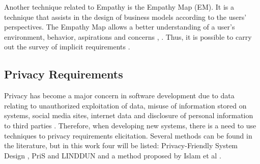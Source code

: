 \documentclass[conference]{IEEEtran}
\begin{document}

Another technique related to Empathy is the Empathy Map (EM). It is a technique that assists in the design of business models according to the users' perspectives. The Empathy Map allows a better understanding of a user's environment, behavior, aspirations and concerns \cite{DBLP:conf/hci/FerreiraBC16}, \cite{DBLP:conf/hicss/BittnerS19}. Thus, it is possible to carry out the survey of implicit requirements \cite{DBLP:conf/re/LevyH18}.

\subsection{Privacy Requirements}


Privacy has become a major concern in software development due to data relating to unauthorized exploitation of data, misuse of information stored on systems, social media sites, internet data and disclosure of personal information to third parties \cite{DBLP:conf/wer/2019}. Therefore, when developing new systems, there is a need to use techniques to privacy requirements elicitation. Several methods can be found in the literature, but in this work four will be listed: Privacy-Friendly System Design \cite{DBLP:journals/access/CaizaMGAY19}, PriS and LINDDUN \cite{DBLP:conf/IEEEares/Beckers12} and a method proposed by Islam et al \cite{DBLP:journals/tcc/IslamOKMG18}.

\end{document}
